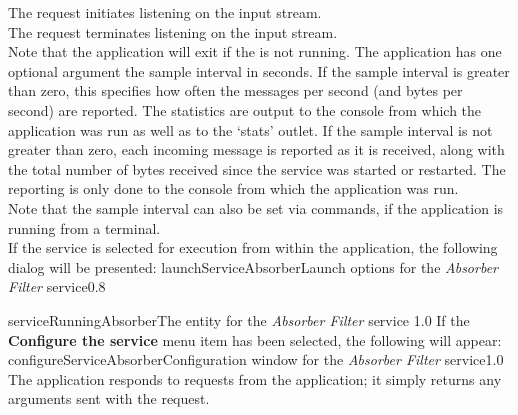 The  request initiates listening
on the input stream.\\

The  request terminates listening
on the input stream.\\

Note that the application will exit if the  is not
running.
\condPage{}
The application has one optional argument \longDash{} the sample interval in seconds.
If the sample interval is greater than zero, this specifies how often the messages per
second (and bytes per second) are reported.
The statistics are output to the console from which the application was run as well as to
the `stats' outlet.
If the sample interval is not greater than zero, each incoming message is reported as it
is received, along with the total number of bytes received since the service was started
or restarted.
The reporting is only done to the console from which the application was run.
\insertAppParameters
{}
\insertFilterServiceComment\\

Note that the sample interval can also be set via commands, if the application is
running from a terminal.\\

\insertStandardServiceCommands
\condPage
If the service is selected for execution from within the \emph{\MMMU} application, the
following dialog will be presented:
%
{launchServiceAbsorber}{Launch options for the \emph{Absorber Filter} service}{0.8}

%
{serviceRunningAbsorber}{The \emph{\MMMU} entity for the \emph{Absorber Filter} service}%
{1.0}
\condPage{}
If the \textbf{Configure the service} menu item has been selected, the following will
appear:
%
{configureServiceAbsorber}{Configuration window for the \emph{Absorber Filter}
service}{1.0}
The  application responds to
 requests from the
 application; it simply returns any arguments
sent with the request.\\

